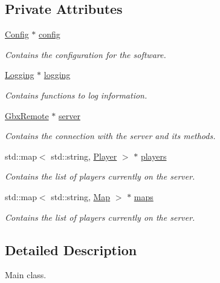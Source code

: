 \subsection*{Private Attributes}
\begin{DoxyCompactItemize}
\item 
\hyperlink{classConfig}{Config} $\ast$ \hyperlink{classManiaPP_a9a91437fa70afd52c2dce19298888e36}{config}
\begin{DoxyCompactList}\small\item\em Contains the configuration for the software. \end{DoxyCompactList}\item 
\hyperlink{classLogging}{Logging} $\ast$ \hyperlink{classManiaPP_aa4cea090301bdf0bf652ad377e7b01c0}{logging}
\begin{DoxyCompactList}\small\item\em Contains functions to log information. \end{DoxyCompactList}\item 
\hyperlink{classGbxRemote}{Gbx\-Remote} $\ast$ \hyperlink{classManiaPP_ab81311d6901990cb99a7a30e0cbaab11}{server}
\begin{DoxyCompactList}\small\item\em Contains the connection with the server and its methods. \end{DoxyCompactList}\item 
std\-::map$<$ std\-::string, \hyperlink{structPlayer}{Player} $>$ $\ast$ \hyperlink{classManiaPP_a45712ccfa91b20242b39cb1164d305d8}{players}
\begin{DoxyCompactList}\small\item\em Contains the list of players currently on the server. \end{DoxyCompactList}\item 
std\-::map$<$ std\-::string, \hyperlink{structMap}{Map} $>$ $\ast$ \hyperlink{classManiaPP_a903ccf13c65b15c99595cb571214799d}{maps}
\begin{DoxyCompactList}\small\item\em Contains the list of players currently on the server. \end{DoxyCompactList}\end{DoxyCompactItemize}


\subsection{Detailed Description}
Main class. 

